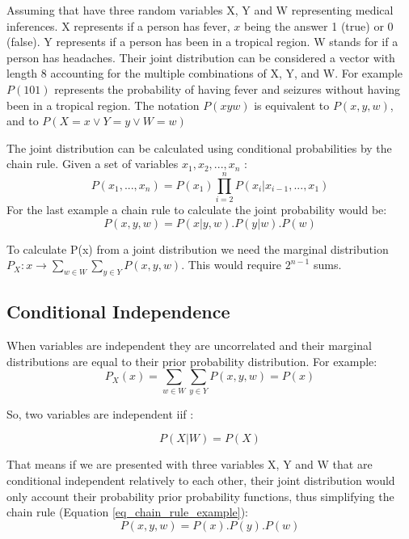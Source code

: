 Assuming that have three random  variables X, Y and W representing medical inferences. X represents if a person has fever, $x$ being the answer 1 (true) or 0 (false). Y represents if a person has been in a tropical region. W stands for if a person has headaches. Their joint distribution can be considered a vector with length 8 accounting for the multiple combinations of X, Y, and W. For example $P(101)$ represents the probability of having fever and seizures without having been in a tropical region. The notation $P(xyw)$ is equivalent to $P(x,y,w)$, and to $P(X=x \vee Y=y \vee W=w)$

The joint distribution can be calculated using conditional probabilities by the chain rule\cite{Norvig2003}. Given a set of variables $x_{1},x_{2},..., x_{n}$ :
\begin{equation}
P(x_{1}, ..., x_{n})=P(x_{1}) \prod_{i=2}^{n}P(x_{i}\vert x_{i - 1}, ... , x_{1})
\end{equation}
For the last example a chain rule to calculate the joint probability would be:
\begin{equation}
\label{eq_chain_rule_example}
P(x,y,w)= P(x \vert y, w) . P(y \vert w) . P(w)  
\end{equation}

To calculate P(x) from a joint distribution we need the marginal distribution $P_{X} : x \rightarrow \sum_{w \in W} \sum_{y \in Y}P(x , y, w)$. This would require $2^{n-1}$ sums. 


\subsection{Conditional Independence}

When variables are independent they are uncorrelated and their marginal distributions are equal to their prior probability distribution\cite{Pearl2000}. For example: 
\begin{equation}
 P_{X}(x) = \sum_{w \in W} \sum_{y \in Y}P(x , y, w) = P(x) 
\end{equation}

So, two variables are independent iif \cite{feller1}\cite{Norvig2003}:

\begin{equation}
P(X\vert W) = P(X)
\end{equation}

That means if we are presented with three variables  X, Y and W that are conditional independent relatively to each other, their joint distribution would only account their probability prior probability functions, thus simplifying the chain rule (Equation \eqref{eq_chain_rule_example}):
\begin{equation}
P(x, y , w) = P(x) . P(y) . P(w)
\end{equation}


